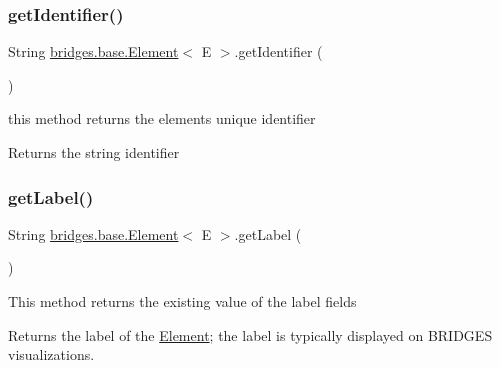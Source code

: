 \hypertarget{classbridges_1_1base_1_1_element_ad5496f568b4cca3909800eceea5fb47d}{}\label{classbridges_1_1base_1_1_element_ad5496f568b4cca3909800eceea5fb47d} 
\subsubsection{\texorpdfstring{get\+Identifier()}{getIdentifier()}}
{\footnotesize\ttfamily String \hyperlink{classbridges_1_1base_1_1_element}{bridges.\+base.\+Element}$<$ E $>$.get\+Identifier (\begin{DoxyParamCaption}{ }\end{DoxyParamCaption})}

this method returns the element\textquotesingle{}s unique identifier \begin{DoxyReturn}{Returns}
the string identifier 
\end{DoxyReturn}
\hypertarget{classbridges_1_1base_1_1_element_a5c831a0238de487765f6021a887f1542}{}\label{classbridges_1_1base_1_1_element_a5c831a0238de487765f6021a887f1542} 
\subsubsection{\texorpdfstring{get\+Label()}{getLabel()}}
{\footnotesize\ttfamily String \hyperlink{classbridges_1_1base_1_1_element}{bridges.\+base.\+Element}$<$ E $>$.get\+Label (\begin{DoxyParamCaption}{ }\end{DoxyParamCaption})}

This method returns the existing value of the label fields

\begin{DoxyReturn}{Returns}
the label of the \hyperlink{classbridges_1_1base_1_1_element}{Element}; the label is typically displayed on B\+R\+I\+D\+G\+ES visualizations. 
\end{DoxyReturn}
\hypertarget{classbridges_1_1base_1_1_element_a7978552c7b36e28c302f611fc1958e7f}{}\label{classbridges_1_1base_1_1_element_a7978552c7b36e28c302f611fc1958e7f} 
